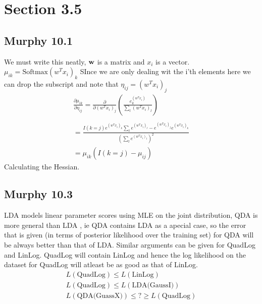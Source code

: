 \section{Section 3.5}

\subsection{Murphy 10.1}
We must write this neatly, $\vb{w}$ is a matrix and $x_i $ is a vector.
$\mu_{ik} = \text{Softmax}(w^T x_i)_k$ SInce we are only dealing wit the i'th elements here
we can drop the subscript and note that $\eta_{ij} = (w^Tx_i)_j$
\begin{align}
    \frac{\partial \mu_{ik}}{\partial \eta_{ij} } = \frac{\partial}{\partial (w^Tx_i)_j } (\frac{e^(w^Tx_i)_k}{\sum_l (w^Tx_i)_l}) \\ \\
    = \frac{I(k = j)e^{(w^Tx_i)_k}\sum_l e^{(w^Tx_i)_l} - e^{(w^Tx_i)_j}e^{(w^Tx_i)_k}}{(\sum_l e^{(w^Tx_i)_l})^2} \\ 
    = \mu_{ik} (I( k = j) - \mu_{ij})
\end{align}
Calculating the Hessian.


\subsection{Murphy 10.3}
LDA models linear parameter scores using MLE on the joint distribution, QDA is more general than
LDA , ie QDA contains LDA as a apecial case, so the error that is given (in terms of posterior likelihood over the training set)
for QDA will be always better than that of LDA. Similar arguments can be given for QuadLog and LinLog. QuadLog will contain LinLog and
hence the log likelihood on the dataset for QuadLog will atleast be as good as that of LinLog.
\begin{gather}
    L(\text{QuadLog}) \le L(\text{LinLog}) \\
    L(\text{QuadLog}) \le L(\text{LDA(GaussI)}) \\
    L(\text{QDA(GuassX)}) \le  ? \ge L(\text{QuadLog}) \\
\end{gather}
